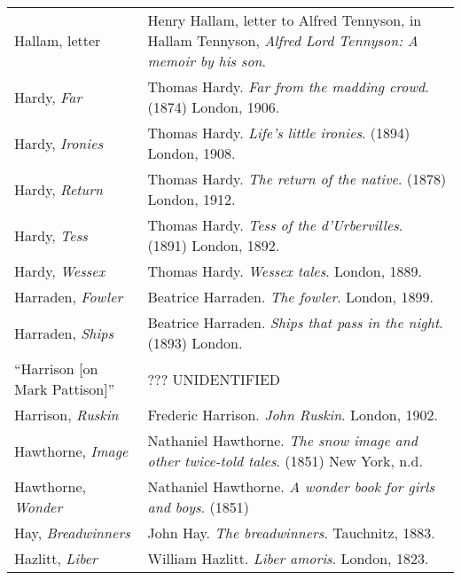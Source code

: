 \begin{longtable}{p{} p{}}
Hallam, letter & Henry Hallam, letter to Alfred Tennyson, in Hallam Tennyson, \textit{Alfred Lord Tennyson: A memoir by his son}. \\ %
%

Hardy, \textit{Far} & Thomas Hardy. \textit{Far from the madding crowd}. (1874) London, 1906. \\
Hardy, \textit{Ironies} & Thomas Hardy. \textit{Life's little ironies}. (1894) London, 1908. \\
Hardy, \textit{Return} & Thomas Hardy. \textit{The return of the native}. (1878) London, 1912. \\
Hardy, \textit{Tess} & Thomas Hardy. \textit{Tess of the d'Urbervilles}. (1891) London, 1892. \\
Hardy, \textit{Wessex} & Thomas Hardy. \textit{Wessex tales}. London, 1889. \\

Harraden, \textit{Fowler} & Beatrice Harraden. \textit{The fowler}. London, 1899.  \\
Harraden, \textit{Ships} & Beatrice Harraden. \textit{Ships that pass in the night}. (1893) London.  \\

\raggedright{``Harrison {[}on Mark Pattison{]}''} & ??? UNIDENTIFIED\\

Harrison, \textit{Ruskin} & Frederic Harrison. \textit{John Ruskin}. London, 1902. \\

Hawthorne, \textit{Image} & Nathaniel Hawthorne. \textit{The snow image and other twice-told tales}. (1851) New York, n.d. \\
Hawthorne, \textit{Wonder} & Nathaniel Hawthorne. \textit{A wonder book for girls and boys}. (1851) \\ %

Hay, \textit{Breadwinners} & John Hay. \textit{The breadwinners}. Tauchnitz, 1883. \\ %

Hazlitt, \textit{Liber} & William Hazlitt. \textit{Liber amoris}. London, 1823. \\
%


\end{longtable}
